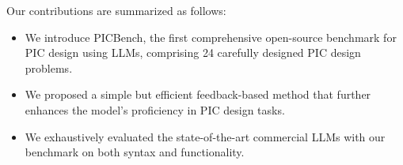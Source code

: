 Our contributions are summarized as follows:
\begin{itemize}
    \item We introduce PICBench, the first comprehensive open-source benchmark for PIC design using LLMs, comprising 24 carefully designed PIC design problems.
    \item We proposed a simple but efficient feedback-based method that further enhances the model’s proficiency in PIC design tasks.
    \item We exhaustively evaluated the state-of-the-art commercial LLMs with our benchmark on both syntax and functionality.
\end{itemize}
